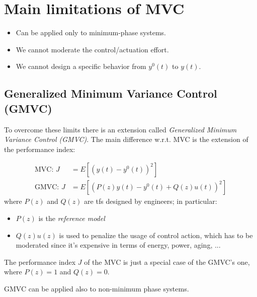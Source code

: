 \section{Main limitations of MVC}

\begin{itemize}
    \item Can be applied only to minimum-phase systems.
    \item We cannot moderate the control/actuation effort.
    \item We cannot design a specific behavior from $y^0(t)$ to $y(t)$.
\end{itemize}


\subsection{Generalized Minimum Variance Control (GMVC)}\label{subsec:GMVC}

To overcome these limits there is an extension called \emph{Generalized Minimum Variance Control (GMVC)}.
The main difference w.r.t. MVC is the extension of the performance index:

\begin{align*}
    \text{MVC: } J &= E\left[ \left(y(t) - y^0(t)\right)^2 \right] \\
    \text{GMVC: } J &= E\left[ \left(P(z)y(t) - y^0(t) + Q(z)u(t)\right)^2 \right]
\end{align*}
where $P(z)$ and $Q(z)$ are \gls{tf}s designed by engineers; in particular:
\begin{itemize}
    \item $P(z)$ is the \emph{reference model}
    \item $Q(z) u(z)$ is used to penalize the usage of control action, which has to be moderated since it's expensive in terms of energy, power, aging, ...
\end{itemize}

\begin{obs}
	The performance index $J$ of the MVC is just a special case of the GMVC's one, where $P(z) = 1$ and $Q(z) = 0$.
\end{obs}

\begin{remark}
	GMVC can be applied also to non-minimum phase systems.
\end{remark}

